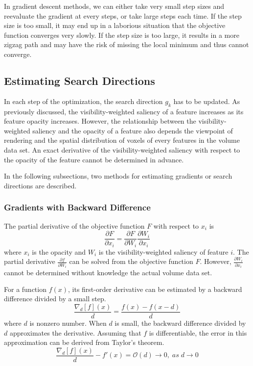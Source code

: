 In gradient descent methods, we can either take very small step sizes and reevaluate the gradient at every steps, or take large steps each time. If the step size is too small, it may end up in a laborious situation that the objective function converges very slowly. If the step size is too large, it results in a more zigzag path and may have the risk of missing the local minimum and thus cannot converge.

\subsection{Estimating Search Directions}
In each step of the optimization, the search direction $ g_{k} $ has to be updated. 
As previously discussed, the visibility-weighted saliency of a feature increases as its feature opacity increases. 
However, the relationship between the visibility-weighted saliency and the opacity of a feature also depends the viewpoint of rendering and the spatial distribution of voxels of every features in the volume data set. An exact derivative of the visibility-weighted saliency with respect to the opacity of the feature cannot be determined in advance.

In the following subsections, two methods for estimating gradients or search directions are described.

\subsubsection{Gradients with Backward Difference}
The partial derivative of the objective function $ F $ with respect to $ x_{i} $ is
\[ \frac{\partial F}{\partial x_{i}} = \frac{\partial F}{\partial W_{i}} \frac{\partial W_{i}}{\partial x_{i}} \]
where $ x_{i} $ is the opacity and $ W_{i} $ is the visibility-weighted saliency of feature $ i $.
The partial derivative $ \frac{\partial f}{\partial W_{i}} $ can be solved from the objective function $ F $.
However, $ \frac{\partial W_{i}}{\partial x_{i}} $ cannot be determined without knowledge the actual volume data set.

For a function $ f(x) $, its first-order derivative can be estimated by a backward difference divided by a small step.
\[ \frac{\nabla_{d}[f](x)}{d}=\frac{f(x)-f(x-d)}{d} \]
where $ d $ is nonzero number.
When $ d $ is small, the backward difference divided by $ d $ approximates the derivative. Assuming that $ f $ is differentiable, the error in this approximation can be derived from Taylor's theorem.
\[ \frac{\nabla_{d}[f](x)}{d}-f'(x)=\mathcal{O}(d) \to 0 , \; as \; d \to 0 \]


